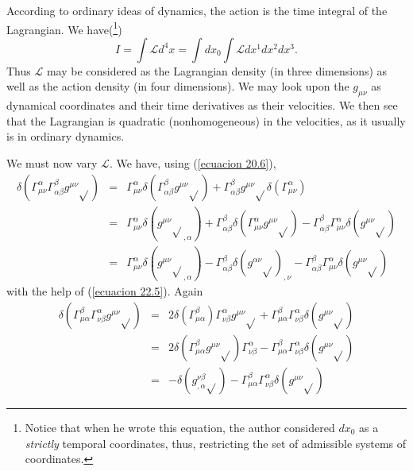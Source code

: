 According to ordinary ideas of dynamics, the action is the time integral of the Lagrangian. We have(\footnote{Notice 
that when he wrote this equation, the author considered $d x_0$ as a \emph{strictly} temporal coordinates, thus, 
restricting the set of admissible systems of coordinates.})
\[
 I = \int{\mathcal{L} d^4 x} = \int{ d x_0 \int{\mathcal{L} dx^1 dx^2 dx^3}}.
\]
Thus $\mathcal{L}$ may be considered as the Lagrangian density (in three dimensions) as well as the action density (in 
four dimensions). We may look upon the $g_{\mu\nu}$ as dynamical coordinates and their time derivatives as their 
velocities. We then see that the Lagrangian is quadratic (nonhomogeneous) in the velocities, as it usually is in 
ordinary dynamics.

We must now vary $\mathcal{L}$. We have, using (\ref{ecuacion 20.6}),
\begin{equation}
 \label{ecuacion 26.5}
 \begin{array}{rcl}
     \delta \left( \Gamma^\alpha_{\mu\nu} \Gamma^\beta_{\alpha\beta} g^{\mu\nu} \sqrt{}\right) & = &
     \Gamma^\alpha_{\mu\nu} \delta \left( \Gamma^\beta_{\alpha\beta} g^{\mu\nu} \sqrt{}\right) + 
     \Gamma^\beta_{\alpha\beta} g^{\mu\nu} \sqrt{}\delta \left( \Gamma^\alpha_{\mu\nu} \right)\\
     & = & \Gamma^\alpha_{\mu\nu} \delta\left( {g^{\mu\nu}\sqrt{}}_{,\alpha}\right)
        + \Gamma^\beta_{\alpha\beta} \delta\left( \Gamma^\alpha_{\mu\nu} g^{\mu\nu} \sqrt{} \right)
        - \Gamma^\beta_{\alpha\beta} \Gamma^\alpha_{\mu\nu} \delta\left( g^{\mu\nu} \sqrt{} \right)\\
     & = & \Gamma^\alpha_{\mu\nu} \delta\left( {g^{\mu\nu}\sqrt{}}_{,\alpha}\right)
        - \Gamma^\beta_{\alpha\beta} \delta\left(  g^{\alpha\nu} \sqrt{} \right)_{,\nu}
        - \Gamma^\beta_{\alpha\beta} \Gamma^\alpha_{\mu\nu} \delta\left( g^{\mu\nu} \sqrt{} \right)
 \end{array}
\end{equation}
with the help of (\ref{ecuacion 22.5}). Again
\begin{equation}
 \label{ecuacion 26.6}
 \begin{array}{rcl}
  \delta\left( \Gamma^\beta_{\mu\alpha} \Gamma^\alpha_{\nu\beta} g^{\mu\nu} \sqrt{} \right) & = & 
    2 \delta \left( \Gamma^\beta_{\mu\alpha} \right) \Gamma^\alpha_{\nu\beta} g^{\mu\nu} \sqrt{}
    + \Gamma^\beta_{\mu\alpha} \Gamma^\alpha_{\nu\beta} \delta \left( g^{\mu\nu} \sqrt{} \right) \\
    & = &
    2 \delta\left( \Gamma^\beta_{\mu\alpha} g^{\mu\nu} \sqrt{} \right) \Gamma^\alpha_{\nu\beta}
    - \Gamma^\beta_{\mu\alpha} \Gamma^\alpha_{\nu\beta} \delta\left( g^{\mu\nu} \sqrt{} \right)  \\
    & = &
    -\delta \left( g^{\nu\beta}_{,\alpha} \sqrt{}\right)
    - \Gamma^\beta_{\mu\alpha} \Gamma^\alpha_{\nu\beta} \delta\left( g^{\mu\nu} \sqrt{} \right) 
 \end{array}
\end{equation}
